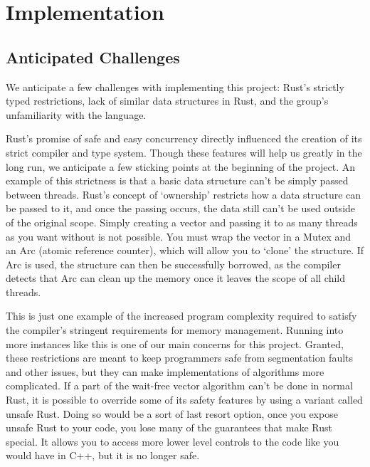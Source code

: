 \documentclass[conference]{IEEEtran}
\begin{document}
\section{Implementation}
\subsection{Anticipated Challenges}
We anticipate a few challenges with implementing this project: Rust’s strictly typed restrictions, lack of similar data structures in Rust, and the group’s unfamiliarity with the language.

Rust's promise of safe and easy concurrency directly influenced the creation of its strict compiler and type system. Though these features will help us greatly in the long run, we anticipate a few sticking points at the beginning of the project. An example of this strictness is that a basic data structure can’t be simply passed between threads. Rust's concept of ‘ownership’ restricts how a data structure can be passed to it, and once the passing occurs, the data still can't be used outside of the original scope. Simply creating a vector and passing it to as many threads as you want without is not possible. You must wrap the vector in a Mutex and an Arc (atomic reference counter), which will allow you to ‘clone’ the structure. If Arc is used, the structure can then be successfully borrowed, as the compiler detects that Arc can clean up the memory once it leaves the scope of all child threads. 

This is just one example of the increased program complexity required to satisfy the compiler's stringent requirements for memory management. Running into more instances like this is one of our main concerns for this project. Granted, these restrictions are meant to keep programmers safe from segmentation faults and other issues, but they can make implementations of algorithms more complicated. If a part of the wait-free vector algorithm can’t be done in normal Rust, it is possible to override some of its safety features by using a variant called unsafe Rust. Doing so would be a sort of last resort option, once you expose unsafe Rust to your code, you lose many of the guarantees that make Rust special. It allows you to access more lower level controls to the code like you would have in C++, but it is no longer safe.

\end{document}
